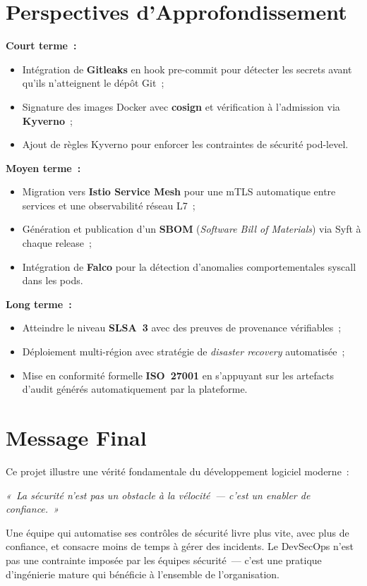 \section*{Perspectives d'Approfondissement}

\textbf{Court terme~:}
\begin{itemize}
  \item Intégration de \textbf{Gitleaks} en hook pre-commit pour détecter les secrets
        avant qu'ils n'atteignent le dépôt Git~;
  \item Signature des images Docker avec \textbf{cosign} et vérification à l'admission
        via \textbf{Kyverno}~;
  \item Ajout de règles Kyverno pour enforcer les contraintes de sécurité pod-level.
\end{itemize}

\textbf{Moyen terme~:}
\begin{itemize}
  \item Migration vers \textbf{Istio Service Mesh} pour une mTLS automatique entre
        services et une observabilité réseau L7~;
  \item Génération et publication d'un \textbf{SBOM} (\textit{Software Bill of Materials})
        via Syft à chaque release~;
  \item Intégration de \textbf{Falco} pour la détection d'anomalies comportementales
        syscall dans les pods.
\end{itemize}

\textbf{Long terme~:}
\begin{itemize}
  \item Atteindre le niveau \textbf{SLSA~3} avec des preuves de provenance vérifiables~;
  \item Déploiement multi-région avec stratégie de \textit{disaster recovery} automatisée~;
  \item Mise en conformité formelle \textbf{ISO~27001} en s'appuyant sur les artefacts
        d'audit générés automatiquement par la plateforme.
\end{itemize}

\section*{Message Final}

Ce projet illustre une vérité fondamentale du développement logiciel moderne~:

\begin{center}
\large\textit{«~La sécurité n'est pas un obstacle à la vélocité~--- c'est un enabler de confiance.~»}
\end{center}

Une équipe qui automatise ses contrôles de sécurité livre plus vite, avec plus de
confiance, et consacre moins de temps à gérer des incidents. Le DevSecOps n'est pas
une contrainte imposée par les équipes sécurité~--- c'est une pratique d'ingénierie
mature qui bénéficie à l'ensemble de l'organisation.
